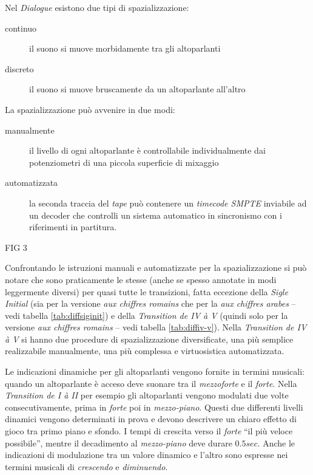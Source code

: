 Nel \emph{Dialogue} esistono due tipi di spazializzazione:

\begin{description}
\item[continuo] il suono si muove morbidamente tra gli altoparlanti
\item[discreto] il suono si muove bruscamente da un altoparlante all'altro
\end{description}

La spazializzazione può avvenire in due modi:

\begin{description}
\item[manualmente] il livello di ogni altoparlante è controllabile individualmente dai potenziometri di una piccola superficie di mixaggio
\item[automatizzata] la seconda traccia del \emph{tape} può contenere un \emph{timecode SMPTE} inviabile ad un decoder che controlli un sistema automatico in sincronismo con i riferimenti in partitura.

\end{description}

FIG 3

Confrontando le istruzioni manuali e automatizzate per la spazializzazione si può notare che sono praticamente le stesse (anche se spesso annotate in modi leggermente diversi) per quasi tutte le transizioni, fatta eccezione della \emph{Sigle Initial} (sia per la versione \emph{aux chiffres romains} che per la \emph{aux chiffres arabes} -- vedi tabella \ref{tab:diffsiginit}) e della \emph{Transition de IV à V} (quindi solo per la versione \emph{aux chiffres romains} -- vedi tabella \ref{tab:diffiv-v}). Nella \emph{Transition de IV à V} si hanno due procedure di spazializzazione diversificate, una più semplice realizzabile manualmente, una più complessa e virtuosistica automatizzata.

Le indicazioni dinamiche per gli altoparlanti vengono fornite in termini musicali: quando un altoparlante è acceso deve suonare tra il \emph{mezzoforte} e il \emph{forte}. Nella \emph{Transition de I à II} per esempio gli altoparlanti vengono modulati due volte consecutivamente, prima in \emph{forte} poi in \emph{mezzo-piano}. Questi due differenti livelli dinamici vengono determinati in prova e devono descrivere un chiaro effetto di gioco tra primo piano e sfondo. I tempi di crescita verso il \emph{forte} “il più veloce possibile”, mentre il decadimento al \emph{mezzo-piano} deve durare $ 0.5 sec $. Anche le indicazioni di modulazione tra un valore dinamico e l'altro sono espresse nei termini musicali di \emph{crescendo} e \emph{diminuendo}.




